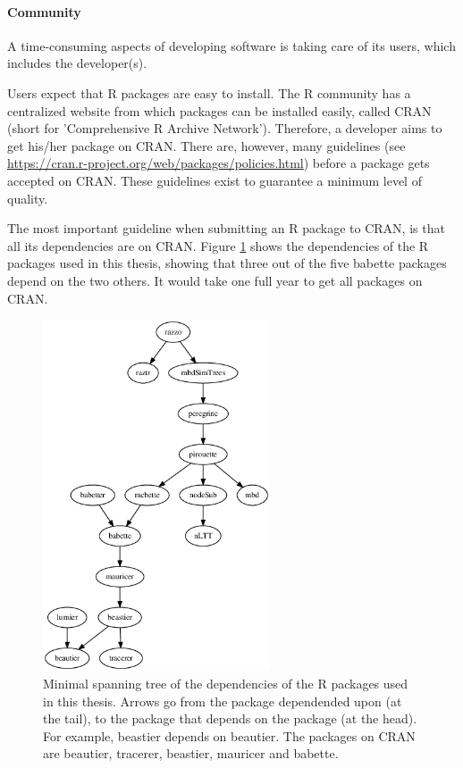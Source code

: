 \paragraph{Community}

A time-consuming aspects of developing software is taking care of its
users, which includes the developer(s).

Users expect that R packages are easy to install.
The R community has a centralized website from which packages
can be installed easily, called CRAN (short for 'Comprehensive R Archive 
Network').
Therefore, a developer aims to get his/her package on CRAN.
There are, however, many 
guidelines (see \url{https://cran.r-project.org/web/packages/policies.html}) before 
a package gets accepted on CRAN.
These guidelines exist to guarantee a minimum level of quality.

The most important guideline when submitting an R package to CRAN,
is that all its dependencies are on CRAN. Figure \ref{fig:dependencies}
shows the dependencies of the R packages used in this thesis, showing that
three out of the five babette packages depend on the two others. 
It would take one full year to get all packages on CRAN.

\begin{figure}[]
  \includegraphics[width=0.6\textwidth]{dependencies.png}
  \caption{
    Minimal spanning tree of the dependencies of the R packages used in this
    thesis. Arrows go from the package dependended upon (at the tail), 
    to the package that depends on the package (at the head). For example,
    beastier depends on beautier. The packages on CRAN are beautier,
    tracerer, beastier, mauricer and babette.
  }
  \label{fig:dependencies}
\end{figure}

